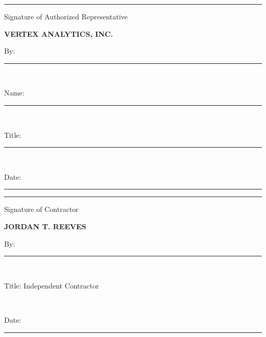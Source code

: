 \documentclass[10pt]{article}
\newcommand{\sigfield}[1]{%
  \par\vspace{18pt}%
  \noindent\rule{0.92\linewidth}{0.4pt}\par%
  \vspace{2pt}%
  {\footnotesize\color{accent}#1}%
}
\begin{document}
\vspace{16pt}
\noindent%
\begin{minipage}[t]{0.46\linewidth}
  \sigfield{Signature of Authorized Representative}

  \vspace{6pt}
  \noindent%
  \begin{tcolorbox}[
    colback=lightbg,
    colframe=accent,
    boxrule=0.5pt,
    arc=3pt,
    boxsep=7pt,
    left=9pt,
    right=9pt,
    top=7pt,
    bottom=7pt,
    nobeforeafter,
    width=\linewidth,
  ]
    {\color{accent}\footnotesize\bfseries VERTEX ANALYTICS, INC.}\\[1pt]
    {\footnotesize By: \rule{0.55\linewidth}{0.4pt}}\\[2pt]
    {\footnotesize Name: \rule{0.55\linewidth}{0.4pt}}\\[2pt]
    {\footnotesize Title: \rule{0.55\linewidth}{0.4pt}}\\[2pt]
    {\footnotesize Date: \rule{0.55\linewidth}{0.4pt}}
  \end{tcolorbox}
\end{minipage}%
\hfill%
\begin{minipage}[t]{0.46\linewidth}
  \sigfield{Signature of Contractor}

  \vspace{6pt}
  \noindent%
  \begin{tcolorbox}[
    colback=lightbg,
    colframe=accent,
    boxrule=0.5pt,
    arc=3pt,
    boxsep=7pt,
    left=9pt,
    right=9pt,
    top=7pt,
    bottom=7pt,
    nobeforeafter,
    width=\linewidth,
  ]
    {\color{accent}\footnotesize\bfseries JORDAN T. REEVES}\\[1pt]
    {\footnotesize By: \rule{0.55\linewidth}{0.4pt}}\\[2pt]
    {\footnotesize Title: Independent Contractor\rule{0pt}{14pt}}\\[2pt]
    {\footnotesize Date: \rule{0.55\linewidth}{0.4pt}}
  \end{tcolorbox}
\end{minipage}
\end{document}
